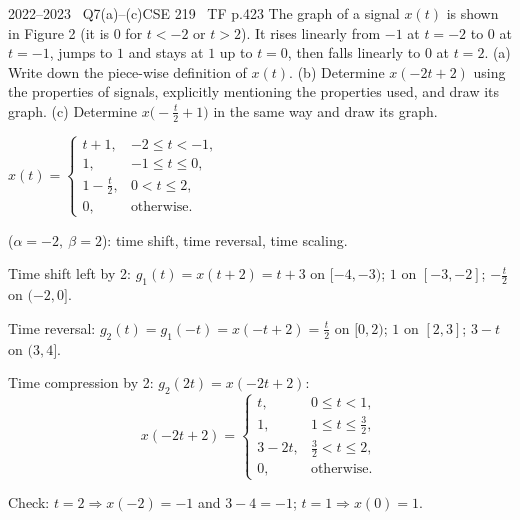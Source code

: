 \begin{qcard}{2022--2023 \textbullet\ Q7(a)--(c)}{CSE 219 \textbullet\ TF p.4}{23}
The graph of a signal $x(t)$ is shown in Figure 2 (it is $0$ for $t<-2$ or $t>2$). It rises linearly from $-1$ at $t=-2$ to $0$ at $t=-1$, jumps to $1$ and stays at $1$ up to $t=0$, then falls linearly to $0$ at $t=2$.
(a) Write down the piece-wise definition of $x(t)$. (b) Determine $x(-2t+2)$ using the properties of signals, explicitly mentioning the properties used, and draw its graph. (c) Determine $x\big(-\tfrac t2+1\big)$ in the same way and draw its graph.
\end{qcard}
\begin{solution}
 $x(t)=\begin{cases}t+1,&-2\le t<-1,\\1,&-1\le t\le0,\\1-\frac t2,&0<t\le2,\\0,&\text{otherwise.}\end{cases}$

 ($\alpha=-2,\ \beta=2$): time shift, time reversal, time scaling.
\begin{steps}
\item Time shift left by 2: $g_1(t)=x(t+2)=t+3$ on $[-4,-3)$; $1$ on $[-3,-2]$; $-\frac t2$ on $(-2,0]$.
\item Time reversal: $g_2(t)=g_1(-t)=x(-t+2)=\frac t2$ on $[0,2)$; $1$ on $[2,3]$; $3-t$ on $(3,4]$.
\item Time compression by 2: $g_2(2t)=x(-2t+2)$:
\[x(-2t+2)=\begin{cases}t,&0\le t<1,\\1,&1\le t\le\frac32,\\3-2t,&\frac32<t\le2,\\0,&\text{otherwise.}\end{cases}\]
\end{steps}
Check: $t=2\Rightarrow x(-2)=-1$ and $3-4=-1$; $t=1\Rightarrow x(0)=1$.


\end{solution}
